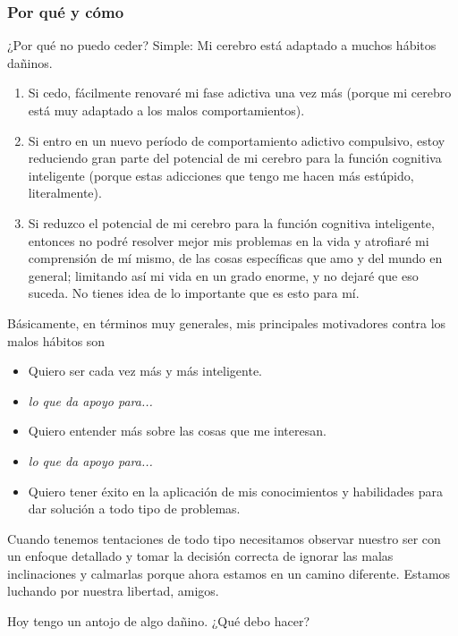 \documentclass[12pt]{article}
\begin{document}
	\subsubsection*{Por qué y cómo}

	¿Por qué no puedo ceder? Simple: Mi cerebro está adaptado a muchos
	hábitos dañinos.

	\begin{enumerate}
	\item Si cedo, fácilmente renovaré mi fase adictiva una vez más (porque
		mi cerebro está muy adaptado a los malos comportamientos).
	\item Si entro en un nuevo período de comportamiento adictivo
	compulsivo, estoy reduciendo gran parte del potencial de mi cerebro para
	la función cognitiva inteligente (porque estas adicciones que tengo me
	hacen más estúpido, literalmente).
	\item Si reduzco el potencial de mi cerebro para la función cognitiva
	inteligente, entonces no podré resolver mejor mis problemas en la vida y
	atrofiaré mi comprensión de mí mismo, de las cosas específicas que amo y
	del mundo en general; limitando así mi vida en un grado enorme, y no
	dejaré que eso suceda. No tienes idea de lo importante que es esto para
	mí.
	\end{enumerate}

	Básicamente, en términos muy generales, mis principales motivadores
	contra los malos hábitos son

	\begin{itemize}
	\item Quiero ser cada vez más y más inteligente.
	\item[] \textit{lo que da apoyo para...}
	\item Quiero entender más sobre las cosas que me interesan.
	\item[] \textit{lo que da apoyo para...}
	\item Quiero tener éxito en la aplicación de mis conocimientos y
		habilidades para dar solución a todo tipo de problemas.
	\end{itemize}

	Cuando tenemos tentaciones de todo tipo necesitamos observar nuestro
	ser con un enfoque detallado y tomar la decisión correcta de ignorar las
	malas inclinaciones y calmarlas porque ahora estamos en un camino
	diferente. Estamos luchando por nuestra libertad, amigos.

	Hoy tengo un antojo de algo dañino. ¿Qué debo hacer?
\end{document}

